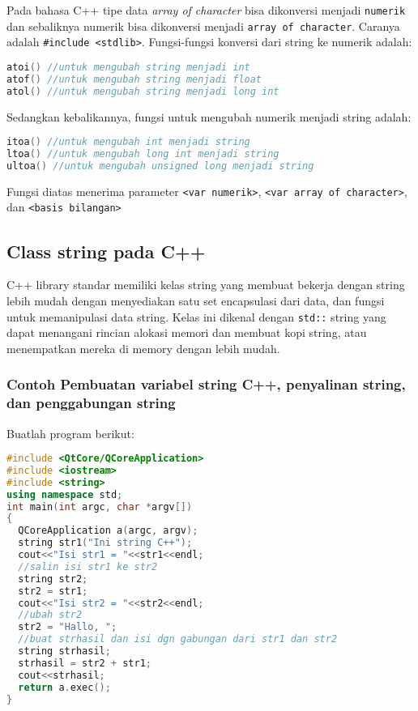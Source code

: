 Pada bahasa C++ tipe data \emph{array of character} bisa dikonversi
menjadi \texttt{numerik} dan sebaliknya numerik bisa dikonversi menjadi
\texttt{array\ of\ character}. Caranya adalah
\texttt{\#include\ \textless{}stdlib\textgreater{}}. Fungsi-fungsi
konversi dari string ke numerik adalah:

\begin{lstlisting}[language=c++, numbers=none]
atoi() //untuk mengubah string menjadi int
atof() //untuk mengubah string menjadi float
atol() //untuk mengubah string menjadi long int
\end{lstlisting}

Sedangkan kebalikannya, fungsi untuk mengubah numerik menjadi string
adalah:

\begin{lstlisting}[language=c++, numbers=none]
itoa() //untuk mengubah int menjadi string
ltoa() //untuk mengubah long int menjadi string
ultoa() //untuk mengubah unsigned long menjadi string
\end{lstlisting}

Fungsi diatas menerima parameter
\texttt{\textless{}var\ numerik\textgreater{}},
\texttt{\textless{}var\ array\ of\ character\textgreater{}}, dan
\texttt{\textless{}basis\ bilangan\textgreater{}}

\subsection{Class string pada C++}\label{class-string-pada-c}

C++ library standar memiliki kelas string yang membuat bekerja dengan
string lebih mudah dengan menyediakan satu set encapsulasi dari data,
dan fungsi untuk memanipulasi data string. Kelas ini dikenal dengan
\texttt{std::} string yang dapat menangani rincian alokasi memori dan
membuat kopi string, atau menempatkan mereka di memory dengan lebih
mudah.

\subsubsection*{Contoh  Pembuatan variabel string C++, penyalinan string, dan
penggabungan string}

Buatlah program berikut:

\begin{lstlisting}[language=c++, caption=Pembuatan variabel string C++ penyalinan string dan
penggabungan string, label=contoh3-24]
#include <QtCore/QCoreApplication>
#include <iostream>
#include <string>
using namespace std;
int main(int argc, char *argv[])
{
  QCoreApplication a(argc, argv);
  string str1("Ini string C++");
  cout<<"Isi str1 = "<<str1<<endl;
  //salin isi str1 ke str2
  string str2;
  str2 = str1;
  cout<<"Isi str2 = "<<str2<<endl;
  //ubah str2
  str2 = "Hallo, ";
  //buat strhasil dan isi dgn gabungan dari str1 dan str2
  string strhasil;
  strhasil = str2 + str1;
  cout<<strhasil;
  return a.exec();
}
\end{lstlisting}

